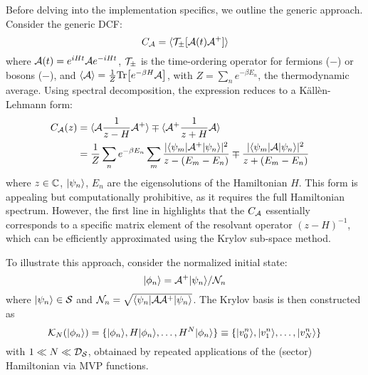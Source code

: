 \documentclass[edipack2.tex]{subfiles}
\begin{document}
Before delving into the implementation specifics, we outline the
generic approach. Consider the generic DCF:
\begin{equation}
  \label{eqGaa}
  C_\AA = \ibra \TT_\pm[ \AA(t) \AA^+ ]\iket
\end{equation}
where $\AA(t)=e^{iHt}\AA e^{-iHt}$, $\TT_\pm$ is the time-ordering
operator for fermions ($-$) or
bosons ($-$), and $\ibra \AA \iket=\frac{1}{Z}\Tr{ \left[ e^{-\beta
      H}\AA \right]}$, with $Z=\sum_ne^{-\beta E_n}$, the thermodynamic
average.
Using spectral decomposition, the expression  reduces to a
K\"all\`en-Lehmann form:
\begin{equation}\label{KLgf}
  \begin{split}
    C_\AA(z) 
    &=  \ibra \AA \frac{1}{z-H} \AA^+\iket
    \mp \ibra \AA^+ \frac{1}{z+H} \AA\iket \cr
    & =\frac{1}{Z}\sum_n e^{-\beta E_n}\sum_m
  \frac{ |\bra{\psi_m}\AA^+ \ket{\psi_n}|^2 }  {z-(E_m-E_n)}
  \mp
  \frac{ |\bra{\psi_m}\AA \ket{\psi_n}|^2 }  {z+(E_m-E_n)}\cr
\end{split}
\end{equation}
where $z\in\CCC$,  $\ket{\psi_n}$, $E_n$ are the eigensolutions of the
Hamiltonian $H$. 
This form is appealing but computationally prohibitive, as it requires
the full Hamiltonian spectrum. However, the first line in 
highlights that the $C_\AA$ essentially corresponds to a specific
matrix element of the resolvant operator $(z-H)^{-1}$, which can be
efficiently approximated using the Krylov sub-space method.

To illustrate this approach, consider the normalized initial state: 
$$
\ket{\phi_n}=\AA^+\ket{\psi_n}/\NN_n
$$
where  $\ket{\psi_n}\in\SS$ and $\NN_n=\sqrt{\bra{\psi_n}\AA
  \AA^+\ket{\psi_n}}$.
The Krylov basis is then constructed as $$\mathcal{K}_{N} (\ket{\phi_n})=\{\ket{\phi_n}, H\ket{\phi_n}, \dots,
H^N\ket{\phi_n}\}\equiv \{\ket{v^n_0}, \ket{v^n_1},\dots, \ket{v^n_N}
\}$$ with $1 \ll N \ll \DD_\SS$, obtainaed by repeated applications of
the (sector) Hamiltonian via MVP functions.
\end{document}
